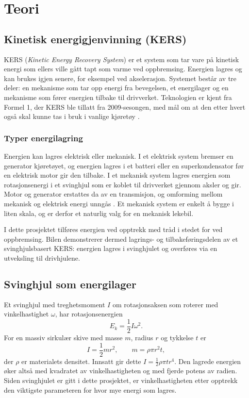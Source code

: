 \section{Teori}
\label{sec:teori}
\subsection{Kinetisk energigjenvinning (KERS)}
\label{sec:kers}
KERS (\emph{Kinetic Energy Recovery System}) er et system som tar vare på kinetisk energi som ellers ville gått tapt som varme ved oppbremsing. Energien lagres og kan brukes igjen senere, for eksempel ved akselerasjon. Systemet består av tre deler: en mekanisme som tar opp energi fra bevegelsen, et energilager og en mekanisme som fører energien tilbake til drivverket. Teknologien er kjent fra Formel 1, der KERS ble tillatt fra 2009-sesongen, med mål om at den etter hvert også skal kunne tas i bruk i vanlige kjøretøy \parencite{batalha_kers}.

\subsubsection{Typer energilagring}
Energien kan lagres elektrisk eller mekanisk. I et elektrisk system bremser en generator kjøretøyet, og energien lagres i et batteri eller en superkondensator før en elektrisk motor gir den tilbake. I et mekanisk system lagres energien som rotasjonsenergi i et svinghjul som er koblet til drivverket gjennom aksler og gir. Motor og generator erstattes da av en transmisjon, og omforming mellom mekanisk og elektrisk energi unngås \parencite{batalha_kers}. Et mekanisk system er enkelt å bygge i liten skala, og er derfor et naturlig valg for en mekanisk lekebil.

I dette prosjektet tilføres energien ved opptrekk med tråd i stedet for ved oppbremsing. Bilen demonstrerer dermed lagrings- og tilbakeføringsdelen av et svinghjulsbasert KERS: energien lagres i svinghjulet og overføres via en utveksling til drivhjulene.

\subsection{Svinghjul som energilager}
Et svinghjul med treghetsmoment $I$ om rotasjonsaksen som roterer med vinkelhastighet $\omega$, har rotasjonsenergien
\begin{equation}
    E_k = \frac{1}{2} I \omega^2 .
    \label{eq:rotasjonsenergi}
\end{equation}
For en massiv sirkulær skive med masse $m$, radius $r$ og tykkelse $t$ er
\begin{equation}
    I = \frac{1}{2} m r^2, \qquad m = \rho \pi r^2 t ,
    \label{eq:treghetsmoment}
\end{equation}
der $\rho$ er materialets densitet. Innsatt gir dette $I = \frac{1}{2}\rho \pi t r^4$. Den lagrede energien øker altså med kvadratet av vinkelhastigheten og med fjerde potens av radien. Siden svinghjulet er gitt i dette prosjektet, er vinkelhastigheten etter opptrekk den viktigste parameteren for hvor mye energi som lagres.

